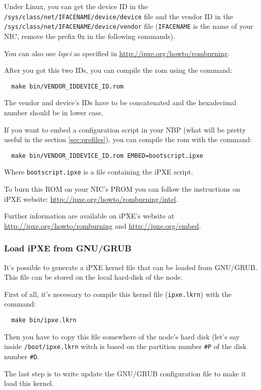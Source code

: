 \documentclass[a4paper,11pt]{article}
\begin{document}
Under Linux, you can get the device ID in the \texttt{/sys/class/net/IFACENAME/device/device} file and the vendor ID in the \texttt{/sys/class/net/IFACENAME/device/vendor} file (\texttt{IFACENAME} is the name of your NIC, remove the prefix 0x in the following commands).

You can also use \emph{lspci} as specified in \url{http://ipxe.org/howto/romburning}.

After you got this two IDs, you can compile the rom using the command:
\begin{verbatim}
  make bin/VENDOR_IDDEVICE_ID.rom
\end{verbatim}
The vendor and device's IDs have to be concatenated and the hexadecimal number should be in lower case.

If you want to embed a configuration script in your NBP (what will be pretty useful in the section \ref{sec:profiles}), you can compile the rom with the command:
\begin{verbatim}
  make bin/VENDOR_IDDEVICE_ID.rom EMBED=bootscript.ipxe
\end{verbatim}
Where \texttt{bootscript.ipxe} is a file containing the iPXE script.

To burn this ROM on your NIC's PROM you can follow the instructions on iPXE website: \url{http://ipxe.org/howto/romburning/intel}.

Further information are available on iPXE's website at \url{http://ipxe.org/howto/romburning} and \url{http://ipxe.org/embed}.

\subsubsection{Load iPXE from GNU/GRUB}
It's possible to generate a iPXE kernel file that can be loaded from GNU/GRUB. This file can be stored on the local hard-disk of the node.

First of all, it's necessary to compile this kernel file (\texttt{ipxe.lkrn}) with the command:
\begin{verbatim}
  make bin/ipxe.lkrn
\end{verbatim}

Then you have to copy this file somewhere of the node's hard disk (let's say inside \texttt{/boot/ipxe.lkrn} witch is based on the partition number \texttt{\#P} of the disk number \texttt{\#D}.

The last step is to write update the GNU/GRUB configuration file to make it load this kernel.
\end{document}

